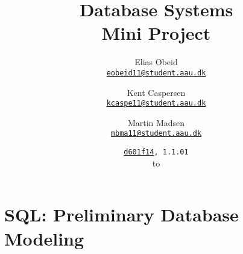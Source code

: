 \documentclass[a4paper, 12pt, twoside, article]{memoir}
\title{Database Systems\\Mini Project}
\date{
  \texttt{\href{mailto:d601f14@cs.aau.dk}{d601f14}, 1.1.01}\\
  \protect\formatdate{6}{2}{2014} to \protect\formatdate{6}{2}{2014}
}
\author{
  Elias Obeid\\
  \href{mailto:eobeid11@student.aau.dk}{\texttt{eobeid11@student.aau.dk}}
  \and
  Kent Caspersen\\
  \href{mailto:kcaspe11@student.aau.dk}{\texttt{kcaspe11@student.aau.dk}}
  \and
  Martin Madsen\\
  \href{mailto:mbma11@student.aau.dk}{\texttt{mbma11@student.aau.dk}}
}
\begin{document}
\frontmatter

\maketitle
\pagebreak

\mainmatter




\appendix

\chapter{SQL: Preliminary Database Modeling}\label{sec:sqlPre}
\inputminted{sql}{1-06.02.14/selfStudy1db.sql}
\end{document}
